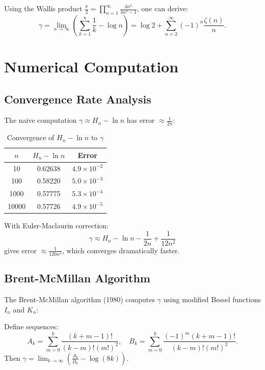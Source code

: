 \begin{theorem}
Using the Wallis product $\frac{\pi}{2} = \prod_{n=1}^\infty \frac{4n^2}{4n^2-1}$, one can derive:
\[
\gamma = \lim_{n \to \infty} \left(\sum_{k=1}^n \frac{1}{k} - \log n\right) = \log 2 + \sum_{n=2}^\infty (-1)^n \frac{\zeta(n)}{n}.
\]
\end{theorem}

\section{Numerical Computation}

\subsection{Convergence Rate Analysis}

The naive computation $\gamma \approx H_n - \ln n$ has error $\approx \frac{1}{2n}$:

\begin{table}[H]
\centering
\begin{tabular}{c|c|c}
$n$ & $H_n - \ln n$ & Error \\
\hline
10 & 0.62638 & $4.9 \times 10^{-2}$ \\
100 & 0.58220 & $5.0 \times 10^{-3}$ \\
1000 & 0.57775 & $5.3 \times 10^{-4}$ \\
10000 & 0.57726 & $4.9 \times 10^{-5}$ \\
\end{tabular}
\caption{Convergence of $H_n - \ln n$ to $\gamma$}
\end{table}

With Euler-Maclaurin correction:
\[
\gamma \approx H_n - \ln n - \frac{1}{2n} + \frac{1}{12n^2}
\]
gives error $\approx \frac{1}{120n^4}$, which converges dramatically faster.

\subsection{Brent-McMillan Algorithm}

The Brent-McMillan algorithm (1980) computes $\gamma$ using modified Bessel functions $I_n$ and $K_n$:

\begin{theorem}
Define sequences:
\[
A_k = \sum_{m=0}^k \frac{(k+m-1)!}{(k-m)! (m!)^2}, \quad B_k = \sum_{m=0}^k \frac{(-1)^m (k+m-1)!}{(k-m)! (m!)^2}.
\]
Then $\gamma = \lim_{k \to \infty} \left(\frac{A_k}{B_k} - \log(8k)\right)$.
\end{theorem}

